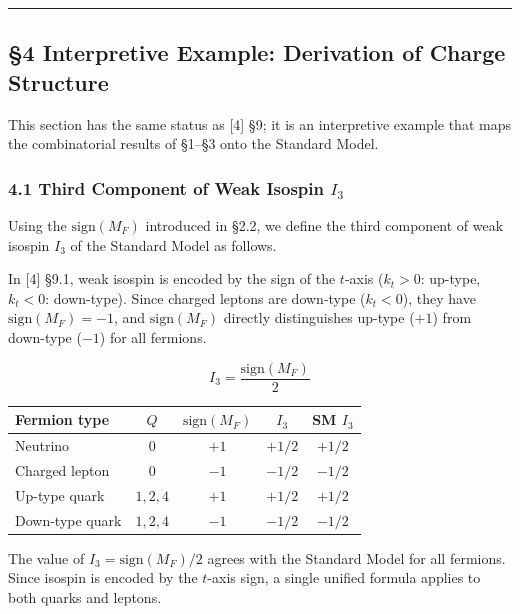 \documentclass[
  a4paper,11pt]{article}
\newcounter{none} %
\begin{document}
\begin{center}\rule{0.5\linewidth}{0.5pt}\end{center}

\subsection{§4 Interpretive Example: Derivation of Charge
Structure}\label{interpretive-example-derivation-of-charge-structure}

This section has the same status as {[}4{]} §9; it is an interpretive
example that maps the combinatorial results of §1--§3 onto the Standard
Model.

\subsubsection{\texorpdfstring{4.1 Third Component of Weak Isospin
\(I_3\)}{4.1 Third Component of Weak Isospin I\_3}}\label{third-component-of-weak-isospin-i_3}

Using the \(\text{sign}(M_F)\) introduced in §2.2, we define the third
component of weak isospin \(I_3\) of the Standard Model as follows.

In {[}4{]} §9.1, weak isospin is encoded by the sign of the \(t\)-axis
(\(k_t > 0\): up-type, \(k_t < 0\): down-type). Since charged leptons
are down-type (\(k_t < 0\)), they have \(\text{sign}(M_F) = -1\), and
\(\text{sign}(M_F)\) directly distinguishes up-type (\(+1\)) from
down-type (\(-1\)) for all fermions.

\[I_3 = \frac{\text{sign}(M_F)}{2}\]

{\def\LTcaptype{none} %
\begin{longtable}[]{@{}lcccc@{}}
\toprule\noalign{}
Fermion type & \(Q\) & \(\text{sign}(M_F)\) & \(I_3\) & SM \(I_3\) \\
\midrule\noalign{}
\endhead
\bottomrule\noalign{}
\endlastfoot
Neutrino & \(0\) & \(+1\) & \(+1/2\) & \(+1/2\) \\
Charged lepton & \(0\) & \(-1\) & \(-1/2\) & \(-1/2\) \\
Up-type quark & \(1,2,4\) & \(+1\) & \(+1/2\) & \(+1/2\) \\
Down-type quark & \(1,2,4\) & \(-1\) & \(-1/2\) & \(-1/2\) \\
\end{longtable}
}

The value of \(I_3 = \text{sign}(M_F)/2\) agrees with the Standard Model
for all fermions. Since isospin is encoded by the \(t\)-axis sign, a
single unified formula applies to both quarks and leptons.
\end{document}
